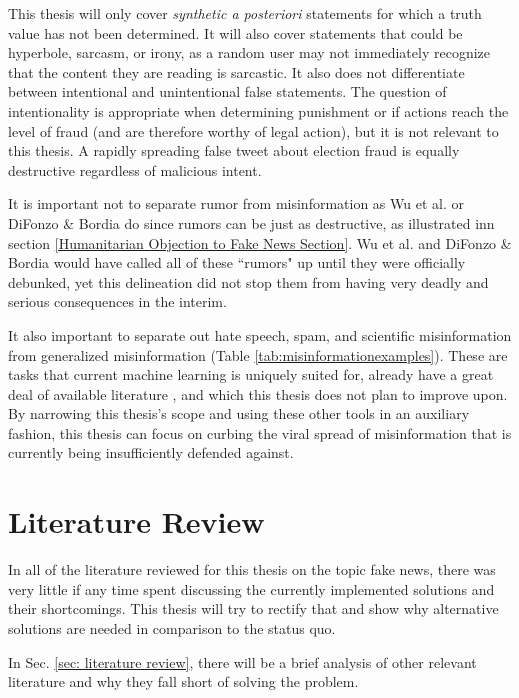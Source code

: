 \documentclass[preprint,review,12pt]{elsarticle}
\begin{document}
This thesis will only cover \textit{synthetic a posteriori} statements for which a truth value has not been determined. It will also cover statements that could be hyperbole, sarcasm, or irony, as a random user may not immediately recognize that the content they are reading is sarcastic. It also does not differentiate between intentional and unintentional false statements. The question of intentionality is appropriate when determining punishment or if actions reach the level of fraud (and are therefore worthy of legal action), but it is not relevant to this thesis. A rapidly spreading false tweet about election fraud is equally destructive regardless of malicious intent.

It is important not to separate rumor from misinformation as Wu et al. or DiFonzo \& Bordia do since rumors can be just as destructive, as illustrated inn section \ref{Humanitarian Objection to Fake News Section}. Wu et al. and DiFonzo \& Bordia would have called all of these ``rumors" up until they were officially debunked, yet this delineation did not stop them from having very deadly and serious consequences in the interim.

It also important to separate out hate speech, spam, and scientific misinformation from generalized misinformation (Table \ref{tab:misinformationexamples}). These are tasks that current machine learning is uniquely suited for, already have a great deal of available literature \cite{xu2019exploiting,wang2010detecting,ahmed2018detecting,al2019spam,oriola2020evaluating,gaydhani2018detecting,al2020lies,farrell2019evidence}, and which this thesis does not plan to improve upon. By narrowing this thesis's scope and using these other tools in an auxiliary fashion, this thesis can focus on curbing the viral spread of misinformation that is currently being insufficiently defended against. 

\section{Literature Review}
In all of the literature reviewed for this thesis on the topic fake news, there was very little if any time spent discussing the currently implemented solutions and their shortcomings. This thesis will try to rectify that and show why alternative solutions are needed in comparison to the status quo.

In Sec. \ref{sec: literature review}, there will be a brief analysis of other relevant literature and why they fall short of solving the problem.
\end{document}
